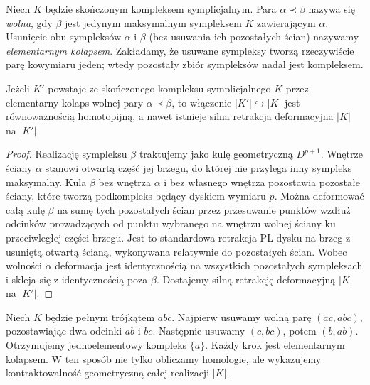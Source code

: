 \begin{definicja}
Niech $K$ będzie skończonym kompleksem symplicjalnym.
Para $\alpha\prec\beta$ nazywa się \emph{wolna},
gdy $\beta$ jest jedynym maksymalnym sympleksem $K$
zawierającym $\alpha$. Usunięcie obu sympleksów
$\alpha$ i $\beta$ (bez usuwania ich pozostałych
ścian) nazywamy \emph{elementarnym kolapsem}.
Zakładamy, że usuwane sympleksy tworzą rzeczywiście
parę kowymiaru jeden; wtedy pozostały zbiór sympleksów
nadal jest kompleksem.
\end{definicja}

\begin{stwierdzenie}
Jeżeli $K'$ powstaje ze skończonego kompleksu
symplicjalnego $K$ przez elementarny kolaps wolnej
pary $\alpha\prec\beta$, to włączenie
$|K'|\hookrightarrow|K|$ jest równoważnością homotopijną,
a nawet istnieje silna retrakcja deformacyjna
$|K|$ na $|K'|$.
\end{stwierdzenie}

\begin{proof}
Realizację sympleksu $\beta$ traktujemy jako kulę
geometryczną $D^{p+1}$. Wnętrze ściany $\alpha$
stanowi otwartą część jej brzegu, do której nie
przylega inny sympleks maksymalny. Kula $\beta$
bez wnętrza $\alpha$ i bez własnego wnętrza
pozostawia pozostałe ściany, które tworzą podkompleks
będący dyskiem wymiaru $p$. Można deformować całą
kulę $\beta$ na sumę tych pozostałych ścian przez
przesuwanie punktów wzdłuż odcinków prowadzących
od punktu wybranego na wnętrzu wolnej ściany ku
przeciwległej części brzegu. Jest to standardowa
retrakcja PL dysku na brzeg z usuniętą otwartą ścianą,
wykonywana relatywnie do pozostałych ścian.
Wobec wolności $\alpha$ deformacja jest identycznością
na wszystkich pozostałych sympleksach i skleja się
z identycznością poza $\beta$. Dostajemy silną
retrakcję deformacyjną $|K|$ na $|K'|$.
\end{proof}

\begin{przyklad}
Niech $K$ będzie pełnym trójkątem $abc$. Najpierw
usuwamy wolną parę $(ac,abc)$, pozostawiając dwa
odcinki $ab$ i $bc$. Następnie usuwamy
$(c,bc)$, potem $(b,ab)$. Otrzymujemy jednoelementowy
kompleks $\{a\}$. Każdy krok jest elementarnym
kolapsem. W ten sposób nie tylko obliczamy homologie,
ale wykazujemy kontraktowalność geometryczną całej
realizacji $|K|$.
\end{przyklad}

